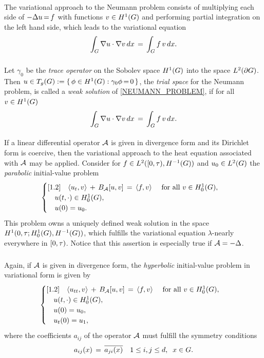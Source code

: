\documentclass[11pt,twoside]{article}
\begin{document}
\paragraph*{} %
The variational approach to the Neumann problem consists of 
multiplying each side of $-\Delta u {\,=\,} f$ with functions $v \in H^1(G)$ and
performing partial integration on the left hand side,
which leads to the variational equation
\[
\int_{G} \nabla u \cdot \nabla v \, dx \,=\,
\int_{G} f \, v \, dx.
\]

\subparagraph*{}
Let $\gamma_0$ be the \textit{trace operator} on the Sobolev space $H^1(G)$
into the space $L^2(\partial G)$. 
Then $u \in T_g(G) := \{\, \phi \in H^1(G): \gamma_0 \phi {\,=\,} 0 \,\}$,
the \textit{trial space} for the Neumann problem,
is called a \textit{weak solution} of \eqref{NEUMANN_PROBLEM},
if for all $v \in H^1(G)$
\[
\int_{G} \nabla u \cdot \nabla v \, dx \,=\,
\int_{G} f \, v \, dx.
\]

\paragraph*{}
If a linear differential operator ${\mathcal{A}}$ is given in divergence form
and its Dirichlet form is coercive,
then the variational approach to the heat equation associated with ${\mathcal{A}}$
may be applied.
Consider for $f \in L^2([0,\tau), H^{-1}(G))$ and $u_0 \in L^2(G)$
the \textit{parabolic} initial-value problem
\[
\begin{cases}[1.2]
\quad \langle u_t,v \rangle \, + \, B_{{\mathcal{A}}}[u,v] \,=\, \langle f,v \rangle 
\quad \mbox{ for all } v \in H_0^{1}(G),\\
\quad u(t,\cdot) \in H_0^{1}(G), \\
\quad u(0) = u_0.\\
\end{cases}
\]
This problem owns a uniquely defined weak solution
in the space $H^1(0,\tau; H_0^{1}(G), H^{-1}(G))$,
which fulfills the variational equation $\lambda$-nearly everywhere in $[0,\tau)$.
Notice that this assertion is especially true if ${\mathcal{A}} = -\Delta$.

\subparagraph*{} %
Again,
if ${\mathcal{A}}$ is given in divergence form,
the \textit{hyperbolic} initial-value problem in variational form
is given by
\[
\begin{cases}[1.2]
\quad \langle u_{tt},v \rangle \, + \, B_{{\mathcal{A}}}[u,v] \,=\, \langle f,v \rangle 
\quad \mbox{ for all } v \in H_0^{1}(G), \\
\quad u(t,\cdot) \in H_0^{1}(G),\\
\quad u(0)=u_0, \\
\quad u_t(0)=u_1, \\
\end{cases}
\]
where the coefficients $a_{ij}$ of the operator ${\mathcal{A}}$ must fulfill
the symmetry conditions
\[
a_{ij}(x) \,=\,
\overline{a_{ji}(x)} \quad 1 \leq i,j \leq d, \;\; x \in G.
\]
\end{document}
